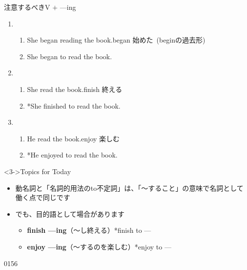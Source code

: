 \documentclass[aspectratio=169,xcolor={dvipsnames,table}]{beamer}
\begin{document}
\begin{frame}[plain]{注意するべきV $+$ ---ing}

 \begin{enumerate}
  \item \begin{enumerate}
	 \item<1-> She began reading the book.\hfill{\scriptsize began  始めた\,\,\,(beginの過去形)}
	 \item<2-> She began to read the book.
	\end{enumerate}
  \item \begin{enumerate}
	 \item<4-> She  read the book.\hfill{\scriptsize finish  終える}
	 \item<5-> *She finished to read the book.
	\end{enumerate}
  \item \begin{enumerate}
	 \item<7-> He  read the book.\hfill{\scriptsize enjoy  楽しむ}
	 \item<8-> *He enjoyed to read the book.
	\end{enumerate}
 \end{enumerate}
%
\begin{block}<3->{Topics for Today}
\begin{itemize}[square]\small
 \item<3->  動名詞と「名詞的用法のto不定詞」は、「〜すること」の意味で名詞として働く点で同じです
 \item<6-> でも、目的語として場合があります \dbend
       \begin{itemize}[circle]\small
	\item<6-> \textbf{finish ---ing}（〜し終える）\hfill{}*finish to ---
	\item<9-> \textbf{enjoy ---ing}（〜するのを楽しむ）\hfill{}*enjoy to ---
       \end{itemize}
 \end{itemize}
     \end{block}

\vspace{-10pt}
\hfill{\tiny 0156}\,{\scriptsize {}}
\end{frame}
\end{document}
